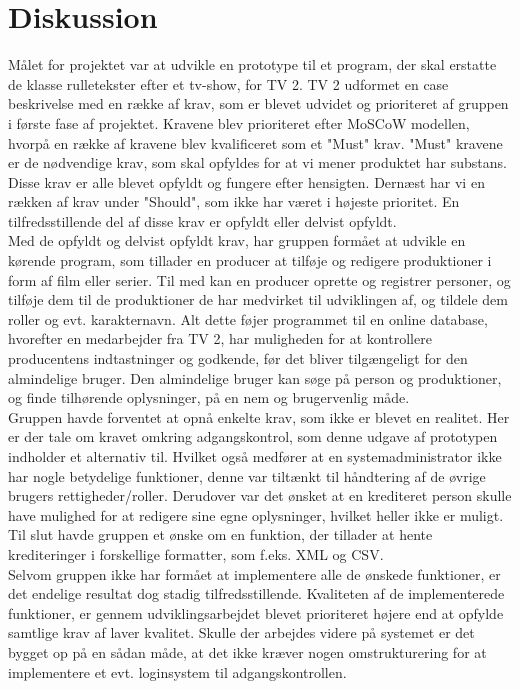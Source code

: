 \section{Diskussion}

Målet for projektet var at udvikle en prototype til et program, der skal erstatte de klasse rulletekster efter et tv-show, for TV 2. TV 2 udformet en case beskrivelse med en række af krav, som er blevet udvidet og prioriteret af gruppen i første fase af projektet. Kravene blev prioriteret efter MoSCoW modellen, hvorpå en række af kravene blev kvalificeret som et "Must" krav. "Must" kravene er de nødvendige krav, som skal opfyldes for at vi mener produktet har substans. Disse krav er alle blevet opfyldt og fungere efter hensigten. Dernæst har vi en rækken af krav under "Should", som ikke har været i højeste prioritet. En tilfredsstillende del af disse krav er opfyldt eller delvist opfyldt. \\
Med de opfyldt og delvist opfyldt krav, har gruppen formået at udvikle en kørende program, som tillader en producer at tilføje og redigere produktioner i form af film eller serier. Til med kan en producer oprette og registrer personer, og tilføje dem til de produktioner de har medvirket til udviklingen af, og tildele dem roller og evt. karakternavn. Alt dette føjer programmet til en online database, hvorefter en medarbejder fra TV 2, har muligheden for at kontrollere producentens indtastninger og godkende, før det bliver tilgængeligt for den almindelige bruger. Den almindelige bruger kan søge på person og produktioner, og finde tilhørende oplysninger, på en nem og brugervenlig måde. \\
Gruppen havde forventet at opnå enkelte krav, som ikke er blevet en realitet. Her er der tale om kravet omkring adgangskontrol, som denne udgave af prototypen indholder et alternativ til. Hvilket også medfører at en systemadministrator ikke har nogle betydelige funktioner, denne var tiltænkt til håndtering af de øvrige brugers rettigheder/roller. Derudover var det ønsket at en krediteret person skulle have mulighed for at redigere sine egne oplysninger, hvilket heller ikke er muligt. Til slut havde gruppen et ønske om en funktion, der tillader at hente krediteringer i forskellige formatter, som f.eks. XML og CSV. \\
Selvom gruppen ikke har formået at implementere alle de ønskede funktioner, er det endelige resultat dog stadig tilfredsstillende. Kvaliteten af de implementerede funktioner, er gennem udviklingsarbejdet blevet prioriteret højere end at opfylde samtlige krav af laver kvalitet. Skulle der arbejdes videre på systemet er det bygget op på en sådan måde, at det ikke kræver nogen omstrukturering for at implementere et evt. loginsystem til adgangskontrollen. \\
